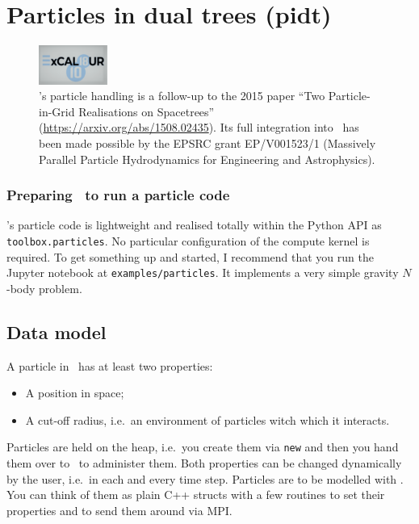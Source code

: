 \chapter{Particles in dual trees (pidt)}
\label{section:pidt}


\begin{figure}[htb]
 \begin{center}
  \includegraphics[width=0.2\textwidth]{61_pidt/ExCALIBUR.png}
 \end{center}
 \caption{
   \Peano's particle handling is a follow-up to the 2015 paper ``Two
   Particle-in-Grid Realisations on Spacetrees''
   (\url{https://arxiv.org/abs/1508.02435}).
   Its full integration into \Peano\ has been made possible by the EPSRC grant 
   EP/V001523/1 (Massively Parallel Particle Hydrodynamics for Engineering and
   Astrophysics).
  }
\end{figure}


\subsection*{Preparing \Peano\ to run a particle code}

\Peano's particle code is lightweight and realised totally within the Python
API as \texttt{toolbox.particles}.
No particular configuration of the compute kernel is required.
To get something up and started, I recommend that you run the Jupyter notebook
at \texttt{examples/particles}.
It implements a very simple gravity $N$-body problem.


\section{Data model}

A particle in \Peano\ has at least two properties:

\begin{itemize}
  \item A position in space;
  \item A cut-off radius, i.e.~an environment of particles witch which it
  interacts.
\end{itemize}

\noindent
Particles are held on the heap, i.e.~you create them via \texttt{new} and then
you hand them over to \Peano\ to administer them.
Both properties can be changed dynamically by the user, i.e.~in each and every
time step.
Particles are to be modelled with \DaStGen.
You can think of them as plain C++ structs with a few routines to set their
properties and to send them around via MPI.


